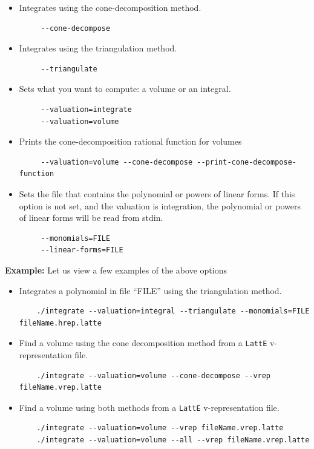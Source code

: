 \documentclass{article}
\newcommand{\latte}{{\tt LattE}\xspace}
\newcommand{\example}{{\bf Example:\space}}
\begin{document}
\begin{itemize}
\item Integrates using the cone-decomposition method.
	\begin{verbatim}
     --cone-decompose
	\end{verbatim} 	
\item Integrates using the triangulation method.
	\begin{verbatim}
     --triangulate
	\end{verbatim} 	
\item Sets what you want to compute: a volume or an integral.
	\begin{verbatim}
     --valuation=integrate
     --valuation=volume
	\end{verbatim} 	
\item Prints the cone-decomposition rational function for volumes
	\begin{verbatim}
     --valuation=volume --cone-decompose --print-cone-decompose-function
	\end{verbatim} 	
\item Sets the file that contains the polynomial or powers of linear forms. If this option is not set, and the valuation is integration, the polynomial or powers of linear forms will be read from stdin.
	\begin{verbatim}
     --monomials=FILE
     --linear-forms=FILE
	\end{verbatim} 	
\end{itemize}

\example
Let us view a few examples of the above options

\begin{itemize}
\item Integrates a polynomial in file ``FILE'' using the triangulation method. 
	\begin{verbatim}
	./integrate --valuation=integral --triangulate --monomials=FILE fileName.hrep.latte
	\end{verbatim} 	
\item Find a volume using the cone decomposition method from a \latte v-representation file.
	\begin{verbatim}
	./integrate --valuation=volume --cone-decompose --vrep fileName.vrep.latte
	\end{verbatim} 	
\item Find a volume using both methods from a \latte v-representation file.
	\begin{verbatim}
	./integrate --valuation=volume --vrep fileName.vrep.latte
	./integrate --valuation=volume --all --vrep fileName.vrep.latte	
	\end{verbatim} 	
\end{itemize}
           
\end{document}
